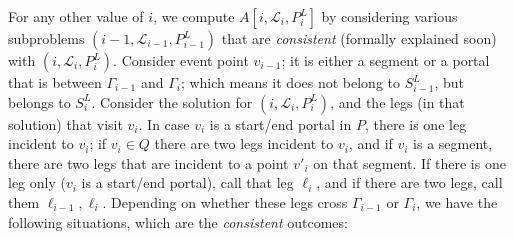 \documentclass[10pt,a4paper]{amsart}
\theoremstyle{thmstyleone}
\begin{document}
For any other value of $i$, we compute $A[i,\mathcal L_i,P^L_i]$ by considering various subproblems 
$(i-1,\mathcal L_{i-1},P^L_{i-1})$ that are {\em consistent} (formally explained soon) with $(i,\mathcal L_{i},P^L_{i})$.
Consider event point $v_{i-1}$; it is either a segment or a portal that is between $\Gamma_{i-1}$ and $\Gamma_i$; which  means it does not belong to $S^L_{i-1}$, but belongs to $S^L_i$. Consider the solution for $(i,\mathcal L_i,P^L_i)$, and the legs (in that solution) that visit $v_i$. In case $v_i$ is a start/end
portal in $P$, there is one leg incident to $v_i$; if $v_i\in Q$ there are two legs incident to $v_i$, and
if $v_i$ is a segment, there are two legs that are incident to a point $v'_i$ on that segment. 
If there is one leg only ($v_i$ is a start/end portal), call that leg $\ell_i$, and if there are two legs, call them $\ell_{i-1},\ell_i$. Depending on whether these legs cross $\Gamma_{i-1}$ or $\Gamma_i$, we have the following situations, which are the {\em consistent} outcomes:
\end{document}

